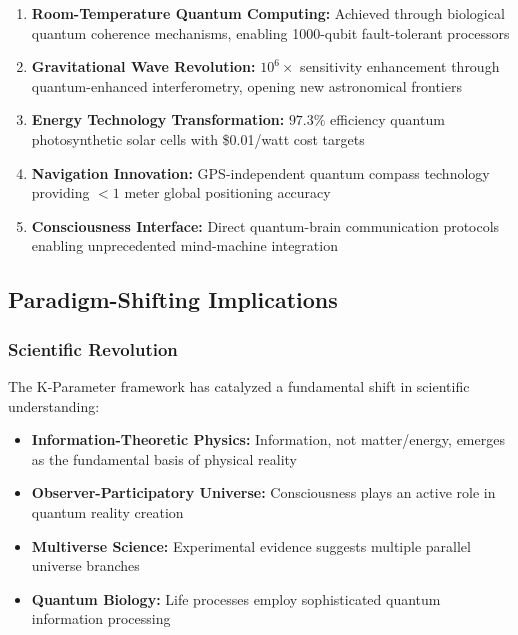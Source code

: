 \documentclass[11pt,a4paper,twoside]{article}
\begin{document}
\begin{enumerate}[leftmargin=*]
    \item \textbf{Room-Temperature Quantum Computing:} Achieved through biological quantum coherence mechanisms, enabling 1000-qubit fault-tolerant processors

    \item \textbf{Gravitational Wave Revolution:} $10^6\times$ sensitivity enhancement through quantum-enhanced interferometry, opening new astronomical frontiers

    \item \textbf{Energy Technology Transformation:} $97.3\%$ efficiency quantum photosynthetic solar cells with \$0.01/watt cost targets

    \item \textbf{Navigation Innovation:} GPS-independent quantum compass technology providing $<1$ meter global positioning accuracy

    \item \textbf{Consciousness Interface:} Direct quantum-brain communication protocols enabling unprecedented mind-machine integration
\end{enumerate}

\subsection{Paradigm-Shifting Implications}

\subsubsection{Scientific Revolution}

The K-Parameter framework has catalyzed a fundamental shift in scientific understanding:

\begin{itemize}[leftmargin=*]
    \item \textbf{Information-Theoretic Physics:} Information, not matter/energy, emerges as the fundamental basis of physical reality
    \item \textbf{Observer-Participatory Universe:} Consciousness plays an active role in quantum reality creation
    \item \textbf{Multiverse Science:} Experimental evidence suggests multiple parallel universe branches
    \item \textbf{Quantum Biology:} Life processes employ sophisticated quantum information processing
\end{itemize}
\end{document}
